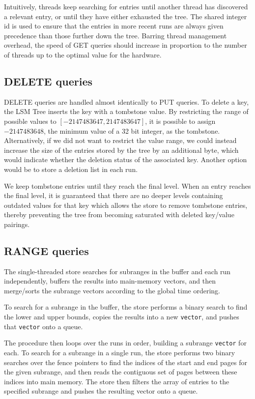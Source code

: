 \documentclass{acm}
\begin{document}
Intuitively, threads keep searching for entries until another thread has discovered a relevant entry, or until they have either exhausted the tree. The shared integer id is used to ensure that the entries in more recent runs are always given precedence than those further down the tree. Barring thread management overhead, the speed of GET queries should increase in proportion to the number of threads up to the optimal value for the hardware.

\subsection{DELETE queries}

DELETE queries are handled almost identically to PUT queries. To delete a key, the LSM Tree inserts the key with a tombstone value. By restricting the range of possible values to $[-2147483647, 2147483647]$, it is possible to assign $-2147483648$, the minimum value of a 32 bit integer, as the tombstone. Alternatively, if we did not want to restrict the value range, we could instead increase the size of the entries stored by the tree by an additional byte, which would indicate whether the deletion status of the associated key. Another option would be to store a deletion list in each run.

We keep tombstone entries until they reach the final level. When an entry reaches the final level, it is guaranteed that there are no deeper levels containing outdated values for that key which allows the store to remove tombstone entries, thereby preventing the tree from becoming saturated with deleted key/value pairings.

\subsection{RANGE queries}

The single-threaded store searches for subranges in the buffer and each run independently, buffers the results into main-memory vectors, and then merge/sorts the subrange vectors according to the global time ordering.

To search for a subrange in the buffer, the store performs a binary search to find the lower and upper bounds, copies the results into a new \texttt{vector}, and pushes that \texttt{vector} onto a queue.

The procedure then loops over the runs in order, building a subrange \texttt{vector} for each. To search for a subrange in a single run, the store performs two binary searches over the fence pointers to find the indices of the start and end pages for the given subrange, and then reads the contiguous set of pages between these indices into main memory. The store then filters the array of entries to the specified subrange and pushes the resulting vector onto a queue.
\end{document}
